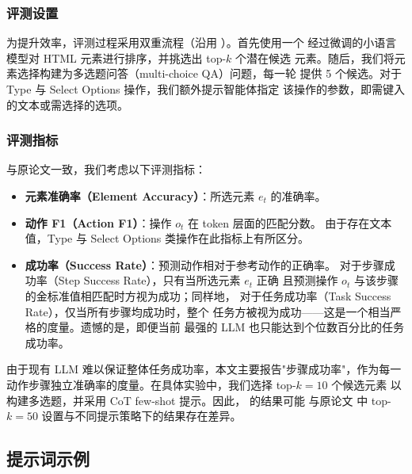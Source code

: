\subsubsection*{评测设置}

为提升效率，评测过程采用双重流程（沿用 \citet{deng2023}）。首先使用一个
经过微调的小语言模型对 HTML 元素进行排序，并挑选出 top-$k$ 个潜在候选
元素。随后，我们将元素选择构建为多选题问答（multi-choice QA）问题，每一轮
提供 5 个候选。对于 Type 与 Select Options 操作，我们额外提示智能体指定
该操作的参数，即需键入的文本或需选择的选项。

\subsubsection*{评测指标}

与原论文一致，我们考虑以下评测指标：
\begin{itemize}
    \item \textbf{元素准确率（Element Accuracy）}：所选元素 $e_t$ 的准确率。
    \item \textbf{动作 F1（Action F1）}：操作 $o_t$ 在 token 层面的匹配分数。
          由于存在文本值，Type 与 Select Options 类操作在此指标上有所区分。
    \item \textbf{成功率（Success Rate）}：预测动作相对于参考动作的正确率。
          对于步骤成功率（Step Success Rate），只有当所选元素 $e_t$ 正确
          且预测操作 $o_t$ 与该步骤的金标准值相匹配时方视为成功；同样地，
          对于任务成功率（Task Success Rate），仅当所有步骤均成功时，整个
          任务方被视为成功——这是一个相当严格的度量。遗憾的是，即便当前
          最强的 LLM 也只能达到个位数百分比的任务成功率。
\end{itemize}

由于现有 LLM 难以保证整体任务成功率，本文主要报告"步骤成功率"，作为每一
动作步骤独立准确率的度量。在具体实验中，我们选择 top-$k=10$ 个候选元素
以构建多选题，并采用 CoT few-shot 提示。因此， 的结果可能
与原论文 \citet{deng2023} 中 top-$k=50$ 设置与不同提示策略下的结果存在差异。

\subsection{提示词示例}


